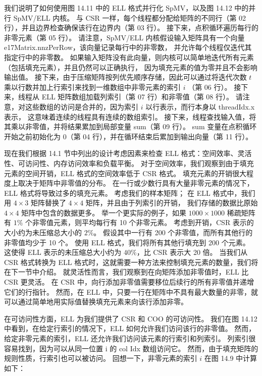 我们说明了如何使用图 14.11 中的 ELL 格式并行化 SpMV，以及图 14.12 中的并行 SpMV/ELL 内核。 
与 CSR 一样，每个线程都分配给矩阵的不同行（第 02 行），并且边界检查确保该行在边界内（第 03 行）。 
接下来，点积循环遍历每行的非零元素（第 05 行）。 
请注意，SpMV/ELL 内核假设输入矩阵具有一个向量 e17Matrix.nnzPerRow，该向量记录每行中的非零数，
并允许每个线程仅迭代其指定行中的非零数。 
如果输入矩阵没有此向量，则内核可以简单地迭代所有元素（包括填充元素），并且仍然可以正确执行，
因为填充元素的值为零并且不会影响输出值。 
接下来，由于压缩矩阵按列优先顺序存储，因此可以通过将迭代次数 $t$ 乘以行数并加上行索引来找到一维数组中非零元素的索引 $i$ （第 06 行）。 
接下来，线程从 ELL 矩阵数组加载列索引（第 07 行）和非零值（第 08 行）。 
请注意，对这些数组的访问是合并的，因为索引 $i$ 以行表示，而行本身以 threadIdx.x 表示，
这意味着连续的线程具有连续的数组索引。 接下来，线程查找输入值，将其乘以非零值，并将结果累加到局部变量 sum（第 09 行）。 
sum 变量在点积循环开始之前初始化为 0（第 04 行），并在循环结束后累加到输出向量（第 11 行）。

现在我们根据 14.1 节中列出的设计考虑因素来检查 ELL 格式：空间效率、灵活性、可访问性、内存访问效率和负载平衡。 
对于空间效率，我们观察到由于填充元素的空间开销，ELL 格式的空间效率低于 CSR 格式。 
填充元素的开销很大程度上取决于矩阵中非零值的分布。 在一行或少数行具有大量非零元素的情况下，ELL 格式将导致过多的填充元素。 
考虑我们的样本矩阵； 在 ELL 格式中，我们用 $4 \times 3$ 矩阵替换了 $4 \times 4$ 矩阵，并且由于列索引的开销，
我们存储的数据比原始 $4 \times 4$ 矩阵中包含的数据更多。 
举一个更实际的例子，如果 $1000 \times 1000$ 稀疏矩阵有 $1 \%$ 个非零值元素，则平均每行有 10 个非零元素。 
考虑到开销，CSR 表示的大小约为未压缩总大小的 $2 \%$。 假设其中一行有 200 个非零值，而所有其他行的非零值均少于 10 个。
使用 ELL 格式，我们将所有其他行填充到 200 个元素。 这使得 ELL 表示的未压缩总大小约为 $40 \%$，比 CSR 表示大 20 倍。 
当我们从 CSR 格式转换为 ELL 格式时，这就需要一种方法来控制填充元素的数量，我们将在下一节中介绍。 
就灵活性而言，我们观察到在向矩阵添加非零值时，ELL 比 CSR 更灵活。 
在 CSR 中，向行添加非零值需要移位后续行的所有非零值并递增它们的行指针。 
然而，在 ELL 中，只要一行在矩阵中不具有最大数量的非零，就可以通过简单地用实际值替换填充元素来向该行添加非零。

在可访问性方面，ELL 为我们提供了 CSR 和 COO 的可访问性。 
我们在图 14.12 中看到，在给定行索引的情况下，ELL 如何允许我们访问该行的非零值。 
然而，给定非零元素的索引，ELL 还允许我们访问该元素的行索引和列索引。 
列索引很容易找到，因为可以从同一位置 i 的 col Idx 数组访问它。 
然而，由于填充矩阵的规则性质，行索引也可以被访问。 回想一下，非零元素的索引 $i$ 在图 14.9 中计算如下：

